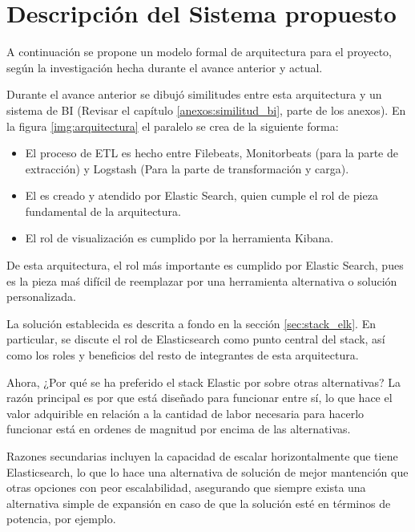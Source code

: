 \section{Descripción del Sistema propuesto}
\label{section:descripcion}

A continuación se propone un modelo formal de arquitectura para el proyecto, según la investigación hecha durante el avance anterior y actual.


Durante el avance anterior se dibujó similitudes entre esta arquitectura y un sistema de BI (Revisar el capítulo \ref{anexos:similitud_bi}, parte de los anexos). En la figura \ref{img:arquitectura} el paralelo se crea de la siguiente forma:

\begin{itemize}
  \item El proceso de ETL es hecho entre Filebeats, Monitorbeats (para la parte de extracción) y Logstash (Para la parte de transformación y carga).
  \item El  es creado y atendido por Elastic Search, quien cumple el rol de pieza fundamental de la arquitectura.
  \item El rol de visualización es cumplido por la herramienta Kibana.
\end{itemize}

De esta arquitectura, el rol más importante es cumplido por Elastic Search, pues es la pieza maś difícil de reemplazar por una herramienta alternativa o solución personalizada. 

La solución establecida es descrita a fondo en la sección \ref{sec:stack_elk}. En particular, se discute el rol de Elasticsearch como punto central del stack, así como los roles y beneficios del resto de integrantes de esta arquitectura.

Ahora, ¿Por qué se ha preferido el stack Elastic por sobre otras alternativas? La razón principal es por que está diseñado para funcionar entre sí, lo que hace el valor adquirible en relación a la cantidad de labor necesaria para hacerlo funcionar está en ordenes de magnitud por encima de las alternativas.

Razones secundarias incluyen la capacidad de escalar horizontalmente que tiene Elasticsearch, lo que lo hace una alternativa de solución de mejor mantención que otras opciones con peor escalabilidad, asegurando que siempre exista una alternativa simple de expansión en caso de que la solución esté  en términos de potencia, por ejemplo.

